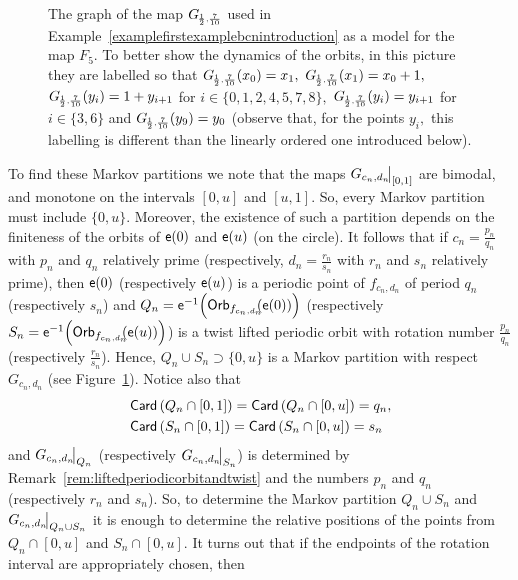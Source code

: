 \documentclass[a4paper, 11pt]{amsart}
\numberwithin{equation}{section}
\theoremstyle{customnumberedtheorem}
\theoremstyle{definitionwithbfnote}
\DeclareMathOperator{\Orb}{\textsf{\upshape Orb}}
\DeclareMathOperator{\Card}{\textsf{\upshape Card}}
\DeclareMathOperator{\eexp}{\textsf{\upshape e}}
\newcommand{\emap}[1]{\ensuremath{\eexp(#1)}}
\newcommand{\evalat}[1]{\bigr\rvert\sb{#1}}
\begin{document}
\begin{figure}
\begin{tikzpicture}[scale=5]
\end{tikzpicture}\vspace*{-2ex}
\caption{The graph of the map $\Gmap$ used in
Example~\ref{examplefirstexamplebcnintroduction}
as a model for the map $F_5$.
To better show the dynamics of the orbits, in this picture
they are labelled so that
$\Gmap(x_0) = x_1,\ \Gmap(x_1) = x_0 + 1,$
$\Gmap(y_i) = 1+y_{i+1}$ for $i \in \{0,1,2,4,5,7,8\},$
$\Gmap(y_i) = y_{i+1}$ for $i \in \{3,6\}$ and
$\Gmap(y_9) = y_{0}$
(observe that, for the points $y_i,$ this labelling is different than
the linearly ordered one introduced below).}\label{figuregraphF5firstexamplebcn}
\vspace*{-2ex}
\end{figure}

To find these Markov partitions we note that the maps
$G_{c_n,d_n}\mkern-4mu\evalat{[0,1]}$ are bimodal,
and monotone on the intervals $[0,u]$ and $[u, 1]$.
So, every Markov partition must include $\{0,u\}.$
Moreover, the existence of such a partition depends on the finiteness
of the orbits of $\emap{0}$ and $\emap{u}$ (on the circle).
It follows that if $c_n = \tfrac{p_n}{q_n}$ with $p_n$ and $q_n$
relatively prime (respectively, $d_n = \tfrac{r_n}{s_n}$
with $r_n$ and $s_n$ relatively prime),
then $\emap{0}$ (respectively $\emap{u}$) is a periodic point of
$f_{c_n,d_n}$ of period $q_n$ (respectively $s_n$)
and $Q_n = \eexp^{-1}\Bigl(\Orb_{f_{c_n,d_n}}\mkern-8mu(\emap{0})\Bigr)$
(respectively $S_n = \eexp^{-1}\Bigl(\Orb_{f_{c_n,d_n}}\mkern-8mu(\emap{u})\Bigr)$)
is a twist lifted periodic orbit with rotation number $\tfrac{p_n}{q_n}$
(respectively $\tfrac{r_n}{s_n}$).
Hence, $Q_n \cup S_n \supset \{0,u\}$ is a Markov partition with respect
$G_{c_n,d_n}$ (see Figure~\ref{figuregraphF5firstexamplebcn}).\enlargethispage{5mm}
Notice also that
\begin{align*}
& \Card\left(Q_n \cap [0,1]\right) = \Card\left(Q_n \cap [0,u]\right) = q_n,\\
& \Card\left(S_n \cap [0,1]\right) = \Card\left(S_n \cap [0,u]\right) = s_n
\end{align*}
and $G_{c_n,d_n}\mkern-4mu\evalat{Q_n}$
(respectively $G_{c_n,d_n}\mkern-4mu\evalat{S_n}$)
is determined by Remark~\ref{rem:liftedperiodicorbitandtwist}
and the numbers $p_n$ and $q_n$ (respectively $r_n$ and $s_n$).
So, to determine the Markov partition $Q_n \cup S_n$ and
$G_{c_n,d_n}\mkern-4mu\evalat{Q_n \cup S_n}$
it is enough to determine the relative positions of the points from
$Q_n \cap [0,u]$ and $S_n \cap [0,u].$ It turns out that if the
endpoints of the rotation interval are appropriately chosen, then
\end{document}
